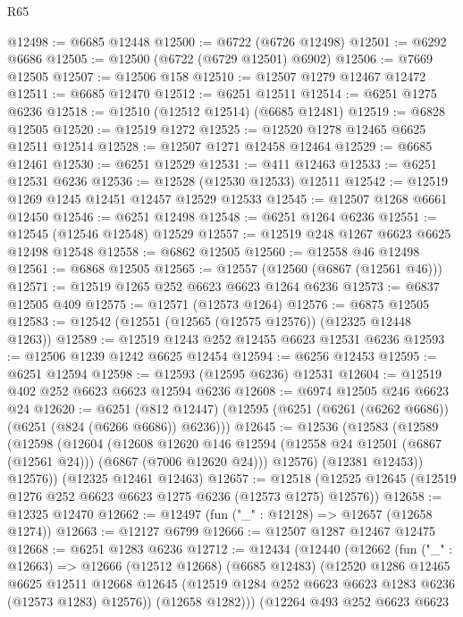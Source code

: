 \begin{lexlean}{R65}
\begin{coremodule}
{@12498 := @6685 @12448
@12500 := @6722 (@6726 @12498)
@12501 := @6292 @6686
@12505 := @12500 (@6722 (@6729 @12501) @6902)
@12506 := @7669 @12505
@12507 := @12506 @158
@12510 := @12507 @1279 @12467 @12472
@12511 := @6685 @12470
@12512 := @6251 @12511
@12514 := @6251 @1275 @6236
@12518 := @12510 (@12512 @12514) (@6685 @12481)
@12519 := @6828 @12505
@12520 := @12519 @1272
@12525 := @12520 @1278 @12465 @6625 @12511 @12514
@12528 := @12507 @1271 @12458 @12464
@12529 := @6685 @12461
@12530 := @6251 @12529
@12531 := @411 @12463
@12533 := @6251 @12531 @6236
@12536 := @12528 (@12530 @12533) @12511
@12542 := @12519 @1269 @1245 @12451 @12457 @12529 @12533
@12545 := @12507 @1268 @6661 @12450
@12546 := @6251 @12498
@12548 := @6251 @1264 @6236
@12551 := @12545 (@12546 @12548) @12529
@12557 := @12519 @248 @1267 @6623 @6625 @12498 @12548
@12558 := @6862 @12505
@12560 := @12558 @46 @12498
@12561 := @6868 @12505
@12565 := @12557 (@12560 (@6867 (@12561 @46)))
@12571 := @12519 @1265 @252 @6623 @6623 @1264 @6236
@12573 := @6837 @12505 @409
@12575 := @12571 (@12573 @1264)
@12576 := @6875 @12505
@12583 := @12542 (@12551 (@12565 (@12575 @12576)) (@12325 @12448 @1263))
@12589 := @12519 @1243 @252 @12455 @6623 @12531 @6236
@12593 := @12506 @1239 @1242 @6625 @12454
@12594 := @6256 @12453
@12595 := @6251 @12594
@12598 := @12593 (@12595 @6236) @12531
@12604 := @12519 @402 @252 @6623 @6623 @12594 @6236
@12608 := @6974 @12505 @246 @6623 @24
@12620 := @6251
    (@812 @12447)
    (@12595 (@6251 (@6261 (@6262 @6686)) (@6251 (@824 (@6266 @6686)) @6236)))
@12645 := @12536
    (@12583
      (@12589
        (@12598
          (@12604
            (@12608
              @12620
              @146
              @12594
              (@12558 @24 @12501 (@6867 (@12561 @24)))
              (@6867 (@7006 @12620 @24)))
            @12576)
          (@12381 @12453))
        @12576))
    (@12325 @12461 @12463)
@12657 := @12518 (@12525 @12645 (@12519 @1276 @252 @6623 @6623 @1275 @6236 (@12573 @1275) @12576))
@12658 := @12325 @12470
@12662 := @12497 (fun ("_" : @12128) => @12657 (@12658 @1274))
@12663 := @12127 @6799
@12666 := @12507 @1287 @12467 @12475
@12668 := @6251 @1283 @6236
@12712 := @12434
    (@12440
      (@12662
        (fun ("_" : @12663) =>
        @12666
          (@12512 @12668)
          (@6685 @12483)
          (@12520
            @1286
            @12465
            @6625
            @12511
            @12668
            @12645
            (@12519 @1284 @252 @6623 @6623 @1283 @6236 (@12573 @1283) @12576))
          (@12658 @1282)))
      (@12264
        @493
        @252
        @6623
        @6623
}
\end{coremodule}
\end{lexlean}
